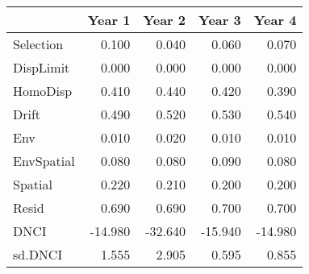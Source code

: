 \begin{longtable}{l|rrrr}
\toprule
\multicolumn{1}{l}{} & Year 1 & Year 2 & Year 3 & Year 4 \\ 
\midrule
Selection & 0.100 & 0.040 & 0.060 & 0.070 \\ 
DispLimit & 0.000 & 0.000 & 0.000 & 0.000 \\ 
HomoDisp & 0.410 & 0.440 & 0.420 & 0.390 \\ 
Drift & 0.490 & 0.520 & 0.530 & 0.540 \\ 
Env & 0.010 & 0.020 & 0.010 & 0.010 \\ 
EnvSpatial & 0.080 & 0.080 & 0.090 & 0.080 \\ 
Spatial & 0.220 & 0.210 & 0.200 & 0.200 \\ 
Resid & 0.690 & 0.690 & 0.700 & 0.700 \\ 
DNCI & -14.980 & -32.640 & -15.940 & -14.980 \\ 
sd.DNCI & 1.555 & 2.905 & 0.595 & 0.855 \\ 
\bottomrule
\end{longtable}

